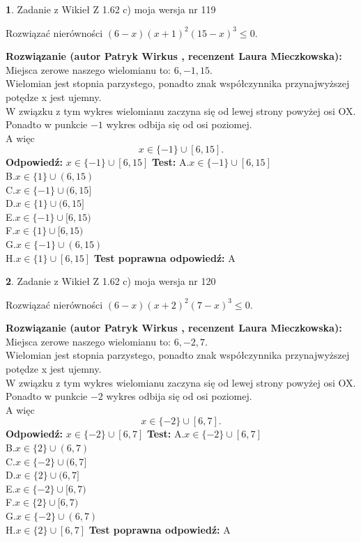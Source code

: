 \documentclass[12pt, a4paper]{article}
\theoremstyle{definition} %
\newtheorem{zad}{}
\newcommand{\zadStart}[1]{\begin{zad}#1\newline}
\newcommand{\zadStop}{\end{zad}}
\newcommand{\rozwStart}[2]{\noindent \textbf{Rozwiązanie (autor #1 , recenzent #2): }\newline}
\newcommand{\rozwStop}{\newline}
\newcommand{\odpStart}{\noindent \textbf{Odpowiedź:}\newline}
\newcommand{\odpStop}{\newline}
\newcommand{\testStart}{\noindent \textbf{Test:}\newline}
\newcommand{\testStop}{\newline}
\newcommand{\kluczStart}{\noindent \textbf{Test poprawna odpowiedź:}\newline}
\newcommand{\kluczStop}{\newline}
\begin{document}
\zadStart{Zadanie z Wikieł Z 1.62 c) moja wersja nr 119}

Rozwiązać nierówności $(6-x)(x+1)^{2}(15-x)^{3}\le0$.
\zadStop
\rozwStart{Patryk Wirkus}{Laura Mieczkowska}
Miejsca zerowe naszego wielomianu to: $6, -1, 15$.\\
Wielomian jest stopnia parzystego, ponadto znak współczynnika przy\linebreak najwyższej potędze x jest ujemny.\\ W związku z tym wykres wielomianu zaczyna się od lewej strony powyżej osi OX.\\
Ponadto w punkcie $-1$ wykres odbija się od osi poziomej.\\
A więc $$x \in \{-1\} \cup [6,15].$$
\rozwStop
\odpStart
$x \in \{-1\} \cup [6,15]$
\odpStop
\testStart
A.$x \in \{-1\} \cup [6,15]$\\
B.$x \in \{1\} \cup (6,15)$\\
C.$x \in \{-1\} \cup (6,15]$\\
D.$x \in \{1\} \cup (6,15]$\\
E.$x \in \{-1\} \cup [6,15)$\\
F.$x \in \{1\} \cup [6,15)$\\
G.$x \in \{-1\} \cup (6,15)$\\
H.$x \in \{1\} \cup [6,15]$
\testStop
\kluczStart
A
\kluczStop



\zadStart{Zadanie z Wikieł Z 1.62 c) moja wersja nr 120}

Rozwiązać nierówności $(6-x)(x+2)^{2}(7-x)^{3}\le0$.
\zadStop
\rozwStart{Patryk Wirkus}{Laura Mieczkowska}
Miejsca zerowe naszego wielomianu to: $6, -2, 7$.\\
Wielomian jest stopnia parzystego, ponadto znak współczynnika przy\linebreak najwyższej potędze x jest ujemny.\\ W związku z tym wykres wielomianu zaczyna się od lewej strony powyżej osi OX.\\
Ponadto w punkcie $-2$ wykres odbija się od osi poziomej.\\
A więc $$x \in \{-2\} \cup [6,7].$$
\rozwStop
\odpStart
$x \in \{-2\} \cup [6,7]$
\odpStop
\testStart
A.$x \in \{-2\} \cup [6,7]$\\
B.$x \in \{2\} \cup (6,7)$\\
C.$x \in \{-2\} \cup (6,7]$\\
D.$x \in \{2\} \cup (6,7]$\\
E.$x \in \{-2\} \cup [6,7)$\\
F.$x \in \{2\} \cup [6,7)$\\
G.$x \in \{-2\} \cup (6,7)$\\
H.$x \in \{2\} \cup [6,7]$
\testStop
\kluczStart
A
\kluczStop
\end{document}
